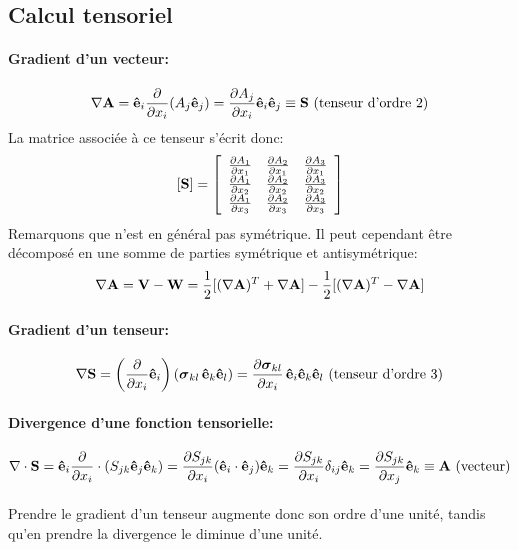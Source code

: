 \subsection{Calcul tensoriel}
\paragraph{Gradient d'un vecteur:}
$$\nabla\textbf{A}=\textbf{ê}_i\frac{\partial}{\partial x_i}(A_j\textbf{ê}_j)=\frac{\partial A_j}{\partial x_i}\textbf{ê}_i\textbf{ê}_j\equiv \textbf{S}\text{ (tenseur d'ordre 2)}$$
La matrice associée à ce tenseur s'écrit donc:
$$[\textbf{S}]=\left[\begin{array}{ccc}
\frac{\partial A_1}{\partial x_1}&\frac{\partial A_2}{\partial x_1} &\frac{\partial A_3}{\partial x_1}\\
\frac{\partial A_1}{\partial x_2}&\frac{\partial A_2}{\partial x_2}&\frac{\partial A_3}{\partial x_2}\\
\frac{\partial A_1}{\partial x_3}&\frac{\partial A_2}{\partial x_3}&\frac{\partial A_3}{\partial x_3}\\
\end{array}\right]
$$
Remarquons que  n'est en général pas symétrique. Il peut cependant être décomposé en une somme de parties symétrique et antisymétrique:
$$\nabla \textbf{A}=\textbf{V}-\textbf{W}=\frac{1}{2}[(\nabla\textbf{A})^T+\nabla\textbf{A}]-\frac{1}{2}[(\nabla\textbf{A})^T-\nabla\textbf{A}]$$
\paragraph{Gradient d'un tenseur:}
$$\nabla\mathbf{S}=\left(\frac{\partial}{\partial x_i}\textbf{ê}_i\right)\left(\boldsymbol{\sigma}_{kl}\,\textbf{ê}_k\textbf{ê}_l\right)=\frac{\partial\boldsymbol{\sigma}_{kl}}{\partial x_i}\,\textbf{ê}_i\textbf{ê}_k\textbf{ê}_l \text{  (tenseur d'ordre 3)} $$
\paragraph{Divergence d'une fonction tensorielle:}
$$\nabla\cdot\textbf{S}=\textbf{ê}_i\frac{\partial}{\partial x_i}\cdot(S_{jk}\textbf{ê}_j\textbf{ê}_k)=\frac{\partial S_{jk}}{\partial x_i}(\textbf{ê}_i\cdot\textbf{ê}_j)\textbf{ê}_k=\frac{\partial S_{jk}}{\partial x_i}\delta_{ij}\textbf{ê}_k=\frac{\partial S_{jk}}{\partial x_j}\textbf{ê}_k\equiv \textbf{A} \text{ (vecteur)}$$
\paragraph{}
Prendre le gradient d'un tenseur augmente donc son ordre d'une unité, tandis qu'en prendre la divergence le diminue d'une unité.

